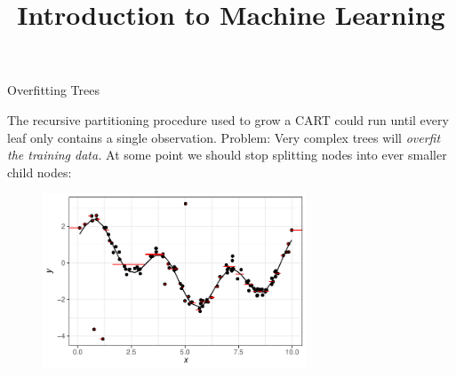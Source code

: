 \documentclass[11pt,compress,t,notes=noshow, xcolor=table]{beamer}
\title{Introduction to Machine Learning}
\institute{\href{https://compstat-lmu.github.io/lecture_i2ml/}{compstat-lmu.github.io/lecture\_i2ml}}
\date{}
\begin{document}
\sloppy





\begin{vbframe}{Overfitting Trees}

The recursive partitioning procedure used to grow a CART could run until every leaf only contains a single observation. Problem: Very complex trees will \emph{overfit the training data.} At some point we should stop splitting nodes into ever smaller child nodes: 

\begin{figure}
\centering
\includegraphics[width=0.7\textwidth]{figure/tree-overfitting-prediction.pdf}
\end{figure}


\end{vbframe}
\end{document}
